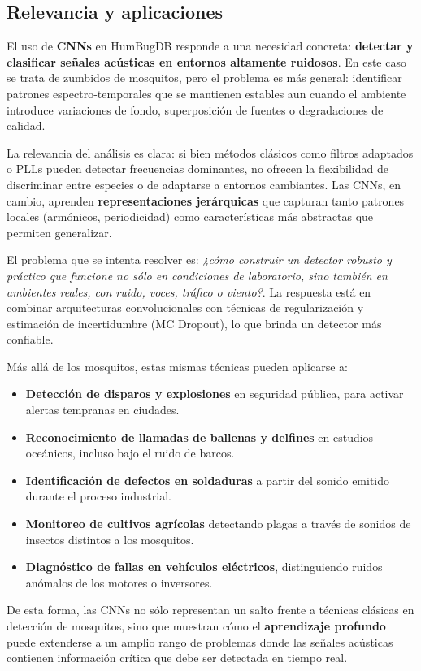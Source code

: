 \subsection{Relevancia y aplicaciones}

El uso de \textbf{CNNs} en HumBugDB responde a una necesidad concreta: 
\textbf{detectar y clasificar señales acústicas en entornos altamente ruidosos}.  
En este caso se trata de zumbidos de mosquitos, pero el problema es más general: 
identificar patrones espectro-temporales que se mantienen estables aun cuando el ambiente introduce 
variaciones de fondo, superposición de fuentes o degradaciones de calidad.

La relevancia del análisis es clara: si bien métodos clásicos como filtros adaptados o PLLs 
pueden detectar frecuencias dominantes, no ofrecen la flexibilidad de discriminar entre especies 
o de adaptarse a entornos cambiantes.  
Las CNNs, en cambio, aprenden \textbf{representaciones jerárquicas} que capturan tanto 
patrones locales (armónicos, periodicidad) como características más abstractas que permiten generalizar.  

El problema que se intenta resolver es: \textit{¿cómo construir un detector robusto y práctico 
	que funcione no sólo en condiciones de laboratorio, sino también en ambientes reales, 
	con ruido, voces, tráfico o viento?}.  
La respuesta está en combinar arquitecturas convolucionales con técnicas de regularización 
y estimación de incertidumbre (MC Dropout), lo que brinda un detector más confiable.

Más allá de los mosquitos, estas mismas técnicas pueden aplicarse a:  
\begin{itemize}
	\item \textbf{Detección de disparos y explosiones} en seguridad pública, para activar alertas tempranas en ciudades.  
	\item \textbf{Reconocimiento de llamadas de ballenas y delfines} en estudios oceánicos, incluso bajo el ruido de barcos.  
	\item \textbf{Identificación de defectos en soldaduras} a partir del sonido emitido durante el proceso industrial.  
	\item \textbf{Monitoreo de cultivos agrícolas} detectando plagas a través de sonidos de insectos distintos a los mosquitos.  
	\item \textbf{Diagnóstico de fallas en vehículos eléctricos}, distinguiendo ruidos anómalos de los motores o inversores.  
\end{itemize}

De esta forma, las CNNs no sólo representan un salto frente a técnicas clásicas en detección de mosquitos, 
sino que muestran cómo el \textbf{aprendizaje profundo} puede extenderse a un amplio rango de problemas 
donde las señales acústicas contienen información crítica que debe ser detectada en tiempo real.

